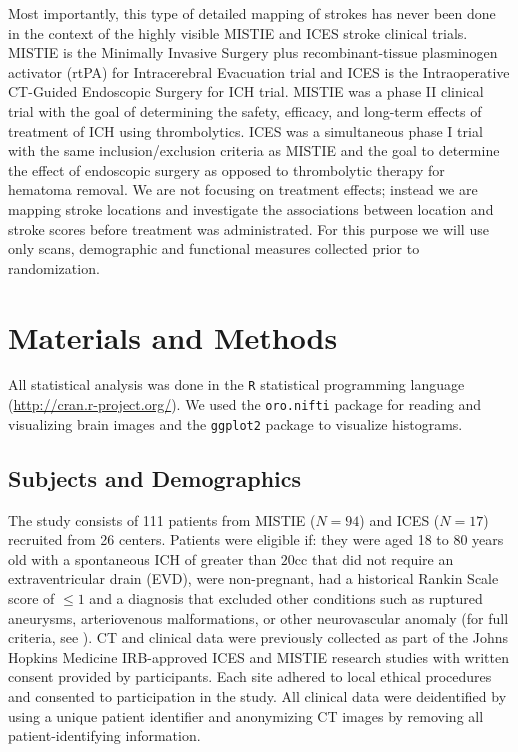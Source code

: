\documentclass[10pt]{article}\usepackage[]{graphicx}\usepackage[]{color}
\begin{document}
Most importantly, this type of detailed mapping of strokes has never been done in the context of the highly visible MISTIE and ICES stroke clinical trials. MISTIE is the Minimally Invasive Surgery plus recombinant-tissue plasminogen activator (rtPA) for Intracerebral Evacuation trial and ICES is the Intraoperative CT-Guided Endoscopic Surgery for ICH trial.  MISTIE was a phase II clinical trial with the goal of determining the safety, efficacy, and long-term effects of treatment of ICH using thrombolytics.  ICES was a simultaneous phase I trial with the same inclusion/exclusion criteria as MISTIE and the goal to determine the effect of endoscopic surgery as opposed to thrombolytic therapy for hematoma removal.  
We are not focusing on treatment effects; instead we are mapping stroke locations and investigate the associations between location and stroke scores before treatment was administrated. For this purpose we will use only scans, demographic and functional measures collected prior to randomization. 

\section*{Materials and Methods}

All statistical analysis was done in the \verb|R| statistical programming language (\url{http://cran.r-project.org/}).  We used the \verb|oro.nifti| package \citep{whitcher_working_2011} for reading and visualizing brain images and the \verb|ggplot2| package \citep{wickham_ggplot2:_2009} to visualize histograms.

\subsection*{Subjects and Demographics}
The study consists of 111 patients from MISTIE ($N=94$) and ICES ($N = 17$) recruited from 26 centers.  Patients were eligible if: they were aged 18 to 80 years old with a spontaneous ICH of greater than $20$cc that did not require an extraventricular drain (EVD), were non-pregnant, had a historical Rankin Scale \citep{rankin_cerebral_1957, swieten_interobserver_1988} score of $≤ 1$ and a diagnosis that excluded other conditions such as ruptured aneurysms, arteriovenous malformations, or other neurovascular anomaly (for full criteria, see \citet{mould_minimally_2013}).  CT and clinical data were previously collected as part of the Johns Hopkins Medicine IRB-approved ICES and MISTIE research studies with written consent provided by participants.  Each site adhered to local ethical procedures and consented to participation in the study.  All clinical data were deidentified by using a unique patient identifier and anonymizing CT images by removing all patient-identifying information.  
\end{document}
